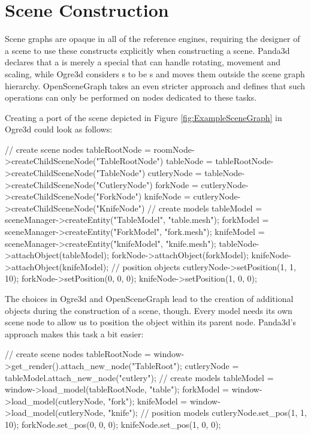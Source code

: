 \section{Scene Construction}
\label{chapter:design:scenegraph}

	Scene graphs are opaque in all of the reference engines, requiring the designer of a scene to use these constructs explicitly when constructing a scene. Panda3d declares that a  is merely a special  that can handle rotating, movement and scaling, while Ogre3d considers s to be s and moves them outside the scene graph hierarchy. OpenSceneGraph takes an even stricter approach and defines that such operations can only be performed on nodes dedicated to these tasks.

	Creating a port of the scene depicted in Figure \ref{fig:ExampleSceneGraph} in Ogre3d could look as follows:

	\begin{code}[2]
		// create scene nodes
		tableRootNode = roomNode->createChildSceneNode("TableRootNode")
		tableNode = tableRootNode->createChildSceneNode("TableNode")
		cutleryNode = tableNode->createChildSceneNode("CutleryNode")
		forkNode = cutleryNode->createChildSceneNode("ForkNode")
		knifeNode = cutleryNode->createChildSceneNode("KnifeNode")
		// create models
		tableModel = sceneManager->createEntity("TableModel", "table.mesh");
		forkModel = sceneManager->createEntity("ForkModel", "fork.mesh");
		knifeModel = sceneManager->createEntity("knifeModel", "knife.mesh");
		tableNode->attachObject(tableModel);
		forkNode->attachObject(forkModel);
		knifeNode->attachObject(knifeModel);
		// position objects
		cutleryNode->setPosition(1, 1, 10);
		forkNode->setPosition(0, 0, 0);
		knifeNode->setPosition(1, 0, 0);
	\end{code}

	The choices in Ogre3d and OpenSceneGraph lead to the creation of additional objects during the construction of a scene, though. Every model needs its own scene node to allow us to position the object within its parent node. Panda3d's approach makes this task a bit easier:

	\begin{code}[2]
		// create scene nodes
		tableRootNode = window->get_render().attach_new_node("TableRoot");
		cutleryNode = tableModel.attach_new_node("cutlery");
		// create models
		tableModel = window->load_model(tableRootNode, "table");
		forkModel = window->load_model(cutleryNode, "fork");
		knifeModel = window->load_model(cutleryNode, "knife");
		// position models
		cutleryNode.set_pos(1, 1, 10);
		forkNode.set_pos(0, 0, 0);
		knifeNode.set_pos(1, 0, 0);
	\end{code}

